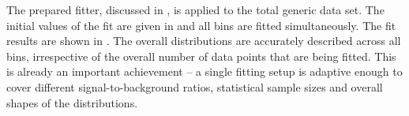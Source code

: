 The prepared fitter, discussed in , is applied to the total generic \MC data set.
The initial values of the fit are given in  and all bins are fitted simultaneously.
The fit results are shown in .
The overall \Mbc distributions are accurately described across all \EB bins, irrespective of the overall number of data points that are being fitted.
This is already an important achievement -- a single fitting setup is adaptive enough to cover different signal-to-background ratios, statistical sample sizes and overall shapes of the distributions.
\begin{figure}[htbp!]
    \centering
\end{figure}
